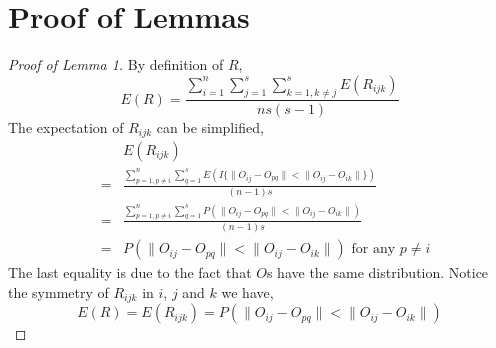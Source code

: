 \documentclass{article}
\begin{document}
\section{Proof of Lemmas}
\begin{proof}[Proof of Lemma 1]
By definition of $R$,
\[E(R)= \frac{\sum\limits_{i=1}^{n} \sum\limits_{j=1}^{s}  \sum\limits_{k=1,k\neq j}^{s} E(R_{ijk})}{ns(s-1)}\]
The expectation of $R_{ijk}$ can be simplified,
\begin{eqnarray*}  
& &E(R_{ijk}) \\
&=&\frac{\sum\limits_{p=1,p\neq i}^{n} \sum\limits_{q=1}^{s} E(I\{\|O_{ij}-O_{pq}\| < \|O_{ij}-O_{ik}\| \}) }{(n-1)s} \\
&=&\frac{\sum\limits_{p=1,p\neq i}^{n} \sum\limits_{q=1}^{s} P(\|O_{ij}-O_{pq}\| < \|O_{ij}-O_{ik}\| ) }{(n-1)s} \\
&=&P(\|O_{ij}-O_{pq}\| < \|O_{ij}-O_{ik}\|) \text{ for any $p\neq i$}
\end{eqnarray*}
The last equality is due to the fact that $O$s have the same distribution. Notice the symmetry of $R_{ijk}$ in $i$, $j$ and $k$ we have,
\[E(R)=E(R_{ijk})=P(\|O_{ij}-O_{pq}\| < \|O_{ij}-O_{ik}\|)\]
\end{proof}
\end{document}
